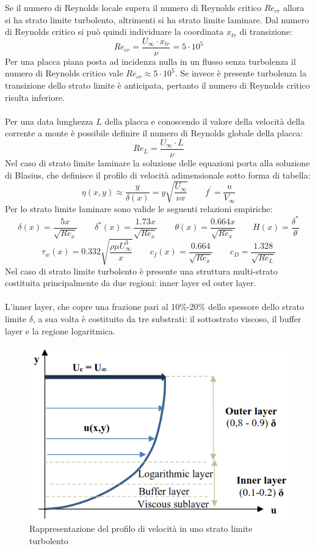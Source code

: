 \noindent Se il numero di Reynolds locale supera il numero di Reynolds critico $Re_{cr}$ allora si ha strato limite turbolento, altrimenti si ha strato limite laminare. Dal numero di Reynolds critico si può quindi individuare la coordinata $x_{tr}$ di transizione:
\begin{equation*}
    Re_{cr}=\frac{U_\infty \cdot x_{tr}}{\nu}=5\cdot10^5
\end{equation*}
Per una placca piana posta ad incidenza nulla in un flusso senza turbolenza il numero di Reynolds critico vale $Re_{cr}\approx5\cdot10^5$. Se invece è presente turbolenza la transizione dello strato limite è anticipata, pertanto il numero di Reynolds critico risulta inferiore.\\\\
Per una data lunghezza $L$ della placca e conoscendo il valore della velocità della corrente a monte è possibile definire il numero di Reynolds globale della placca:
\begin{equation*}
    Re_L = \frac{U_\infty \cdot L}{\nu}
\end{equation*}
Nel caso di strato limite laminare la soluzione delle equazioni porta alla soluzione di Blasius, che definisce il profilo di velocità adimensionale sotto forma di tabella:
\begin{equation*}
    \eta(x,y) \approx \frac{y}{\delta(x)} = y\sqrt{\frac{U_\infty}{\nu x}} \qquad f^\prime = \frac{u}{V_\infty}
\end{equation*}
Per lo strato limite laminare sono valide le seguenti relazioni empiriche:
\begin{equation*}
    \delta(x) = \frac{5x}{\sqrt{Re_x}} \qquad \delta^*(x) = \frac{1.73x}{\sqrt{Re_x}} \qquad \theta(x) = \frac{0.664x}{\sqrt{Re_x}} \qquad H(x) = \frac{\delta^*}{\theta}
\end{equation*}
\begin{equation*}
    \tau_w(x) = 0.332 \sqrt{\frac{\rho \mu U_\infty^3}x} \qquad c_f(x) = \frac{0.664}{\sqrt{Re_x}} \qquad c_D = \frac{1.328}{\sqrt{Re_L}}
\end{equation*}
Nel caso di strato limite turbolento è presente una struttura multi-strato costituita principalmente da due regioni: inner layer ed outer layer.\\\\
L'inner layer, che copre una frazione pari al 10\%-20\% dello spessore dello strato limite $\delta$, a sua volta è costituito da tre substrati: il sottostrato viscoso, il buffer layer e la regione logaritmica.
\begin{figure}[H]
    \centering
    \includegraphics[width=.55\textwidth]{images/9/sltimage.png}
    \caption{Rappresentazione del profilo di velocità in uno strato limite turbolento}
\end{figure}
